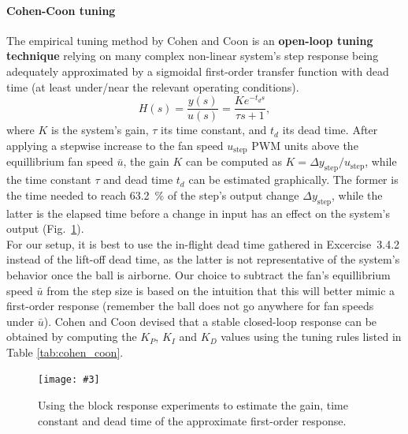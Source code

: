 \documentclass[10pt,twoside,openright]{article}
\newcommand{\mijnfiguur}[5][ht]{            %
    \begin{figure}[#1]                      %
        \begin{center}                      %
            \texttt{[image: \#3]}        %
        \end{center}
        \caption{#4\label{#5}}          %
    \end{figure}
    }
\begin{document}
\paragraph{Cohen-Coon tuning} The empirical tuning method by Cohen and Coon is an \textbf{open-loop tuning technique} relying on many complex non-linear system's step response being adequately approximated by a sigmoidal first-order transfer function with dead time (at least under/near the relevant operating conditions).
\begin{equation}
H(s) = \dfrac{y(s)}{u(s)} = \dfrac{K e^{-t_d s}}{\tau s + 1},
\end{equation}
where $K$ is the system's gain, $\tau$ its time constant, and $t_d$ its dead time. After applying a stepwise increase to the fan speed $u_{\text{step}}$ PWM units above the equillibrium fan speed $\bar{u}$, the gain $K$ can be computed as $K = \Delta y_{\text{step}}/u_{\text{step}}$, while the time constant $\tau$ and dead time $t_d$ can be estimated graphically. The former is the time needed to reach 63.2~\% of the step's output change $\Delta y_{\text{step}}$, while the latter is the elapsed time before a change in input has an effect on the system's output (Fig.~\ref{fig:cohen_coon_tuning}).\\

For our setup, it is best to use the in-flight dead time gathered in Excercise~3.4.2 instead of the lift-off dead time, as the latter is not representative of the system's behavior once the ball is airborne. Our choice to subtract the fan's equillibrium speed $\bar{u}$ from the step size is based on the intuition that this will better mimic a first-order response (remember the ball does not go anywhere for fan speeds under $\bar{u}$). Cohen and Coon devised that a stable closed-loop response can be obtained by computing the $K_P$, $K_I$ and $K_D$ values using the tuning rules listed in Table \ref{tab:cohen_coon}.

\mijnfiguur[h!]{width=\linewidth}{cohen_coon_tuning.pdf}{Using the block response experiments to estimate the gain, time constant and dead time of the approximate first-order response.}{fig:cohen_coon_tuning}
\end{document}
